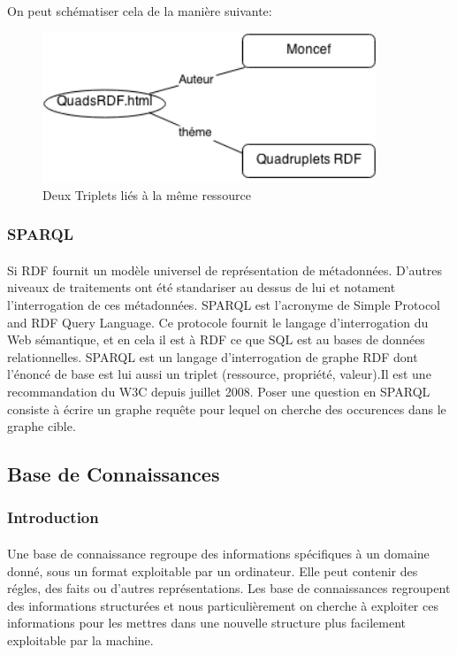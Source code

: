\documentclass[12pt,a4	]{report}
\begin{document}
On peut schématiser cela de la manière suivante:
\begin{figure}[H]
        \centering
                \centering
                \includegraphics[width=10cm]{Diag.png}
               \caption{Deux Triplets liés à la même ressource}

\end{figure}
\subsubsection*{SPARQL}
\paragraph{}
Si RDF fournit un modèle universel de représentation de métadonnées. D'autres niveaux de traitements ont été standariser au dessus de lui  et notament l'interrogation de ces métadonnées.
SPARQL est l'acronyme de Simple Protocol and RDF Query Language. Ce protocole fournit le langage d'interrogation du Web sémantique, et en cela il est à RDF ce que SQL est au bases de données relationnelles. SPARQL est un langage d'interrogation de graphe RDF dont l'énoncé de base est lui aussi un triplet (ressource, propriété, valeur).Il est une recommandation du W3C depuis juillet 2008.
Poser une question en SPARQL consiste à écrire un graphe requête pour lequel on cherche des occurences dans le graphe cible.
\subsection*{Base de Connaissances}
\subsubsection*{Introduction}
\paragraph{}
Une base de connaissance regroupe des informations spécifiques à un domaine donné, sous un format exploitable par un ordinateur. Elle peut contenir des régles, des faits ou d'autres représentations. Les base de connaissances regroupent des informations structurées et nous particulièrement on cherche à exploiter ces informations pour les mettres dans une nouvelle structure plus facilement exploitable par la machine.
\end{document}
